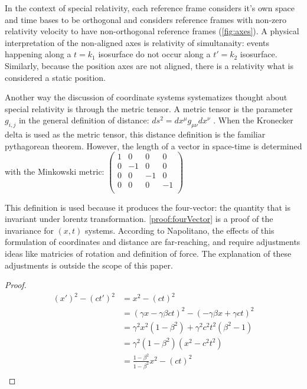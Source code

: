 \documentclass{article}
\begin{document}
In the context of special relativity, each reference frame considers it's own space and time bases to be orthogonal and considers reference frames with non-zero relativity velocity to have non-orthogonal reference frames (\cref{fig:axes}). A physical interpretation of the non-aligned axes is relativity of simultanaity: events happening along a $t=k_1$ isosurface do not occur along a $t'=k_2$ isosurface. Similarly, because the position axes are not aligned, there is a relativity what is considered a static position.

Another way the discussion of coordinate systems systematizes thought about special relativity is through the metric tensor. A metric tensor is the parameter $g_{i,j}$ in the general definition of distance: $ds^2 = dx^{\mu} g_{\mu \nu} dx^{\nu} $ \cite{napolitano}. When the Kronecker delta is used as the metric tensor, this distance definition is the familiar pythagorean theorem. However, the length of a vector in space-time is determined with the Minkowski metric:
$\begin{pmatrix}
1 & 0 & 0 & 0 \\
0 & -1 & 0 & 0 \\
0 & 0 & -1 & 0 \\
0 & 0 & 0 & -1 \\
\end{pmatrix}$

This definition is used because it produces the four-vector: the quantity that is invariant under lorentz transformation. \cref{proof:fourVector} is a proof of the invariance for $(x,t)$ systems. According to Napolitano, the effects of this formulation of coordinates and distance are far-reaching, and require adjustments ideas like matricies of rotation and definition of force. The explanation of these adjustments is outside the scope of this paper.

\begin{proof}
\begin{align*}
(x')^2 - (c t')^2 &= x^2 - (c t)^2 \\
&= (\gamma x - \gamma \beta c t)^2 - (- \gamma \beta x + \gamma c t)^2  \\
&= \gamma^2 x^2 (1 - \beta^2) + \gamma^2 c^2 t^2 (\beta^2 - 1) \\
&= \gamma^2 (1 - \beta^2) (x^2 - c^2 t^2) \\
&= \frac{1 - \beta^2}{1 - \beta^2} x^2 - (c t)^2 \\
\end{align*}
\label{proof:fourVector}
\end{proof}
\end{document}
